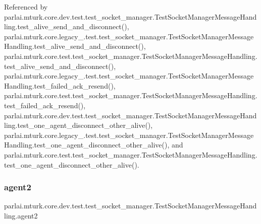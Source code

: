 Referenced by parlai.\+mturk.\+core.\+dev.\+test.\+test\+\_\+socket\+\_\+manager.\+Test\+Socket\+Manager\+Message\+Handling.\+test\+\_\+alive\+\_\+send\+\_\+and\+\_\+disconnect(), parlai.\+mturk.\+core.\+legacy\+\_.\+test.\+test\+\_\+socket\+\_\+manager.\+Test\+Socket\+Manager\+Message\+Handling.\+test\+\_\+alive\+\_\+send\+\_\+and\+\_\+disconnect(), parlai.\+mturk.\+core.\+test.\+test\+\_\+socket\+\_\+manager.\+Test\+Socket\+Manager\+Message\+Handling.\+test\+\_\+alive\+\_\+send\+\_\+and\+\_\+disconnect(), parlai.\+mturk.\+core.\+legacy\+\_.\+test.\+test\+\_\+socket\+\_\+manager.\+Test\+Socket\+Manager\+Message\+Handling.\+test\+\_\+failed\+\_\+ack\+\_\+resend(), parlai.\+mturk.\+core.\+test.\+test\+\_\+socket\+\_\+manager.\+Test\+Socket\+Manager\+Message\+Handling.\+test\+\_\+failed\+\_\+ack\+\_\+resend(), parlai.\+mturk.\+core.\+dev.\+test.\+test\+\_\+socket\+\_\+manager.\+Test\+Socket\+Manager\+Message\+Handling.\+test\+\_\+one\+\_\+agent\+\_\+disconnect\+\_\+other\+\_\+alive(), parlai.\+mturk.\+core.\+legacy\+\_.\+test.\+test\+\_\+socket\+\_\+manager.\+Test\+Socket\+Manager\+Message\+Handling.\+test\+\_\+one\+\_\+agent\+\_\+disconnect\+\_\+other\+\_\+alive(), and parlai.\+mturk.\+core.\+test.\+test\+\_\+socket\+\_\+manager.\+Test\+Socket\+Manager\+Message\+Handling.\+test\+\_\+one\+\_\+agent\+\_\+disconnect\+\_\+other\+\_\+alive().

\mbox{\label{classparlai_1_1mturk_1_1core_1_1dev_1_1test_1_1test__socket__manager_1_1TestSocketManagerMessageHandling_a5499674a391613c550e6b951b068a4b1}} 
\subsubsection{\texorpdfstring{agent2}{agent2}}
{\footnotesize\ttfamily parlai.\+mturk.\+core.\+dev.\+test.\+test\+\_\+socket\+\_\+manager.\+Test\+Socket\+Manager\+Message\+Handling.\+agent2}



